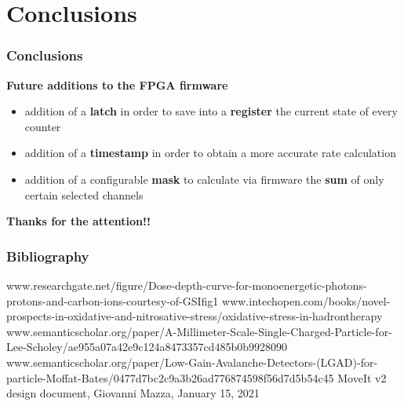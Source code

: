 \documentclass[aspectratio=169]{beamer}
\begin{document}
	\section{Conclusions}
	
	\begin{frame}
	\frametitle{Conclusions }
	\begin{center}
		\textbf{Future additions to the FPGA firmware}
	\end{center}
		\begin{itemize}
			\item addition of a \textbf{latch} in order to save into a \textbf{register} the current state of every counter 
			\item addition of a \textbf{timestamp} in order to obtain a more accurate rate calculation 
			\item addition of a configurable \textbf{mask} to calculate via firmware the \textbf{sum} of only certain selected channels 
			
		\end{itemize}
	
	\vspace{1 cm}
		\begin{center}
			\textbf{Thanks for the attention!!}
		\end{center}
		
	\end{frame}

	\begin{frame}
	\frametitle{Bibliography}
	{\scriptsize 
	\begin{thebibliography}{00}
		www.researchgate.net/figure/Dose-depth-curve-for-monoenergetic-photons-protons-and-carbon-ions-courtesy-of-GSI\textunderscore fig1\textunderscore283521369
		\newline
		www.intechopen.com/books/novel-prospects-in-oxidative-and-nitrosative-stress/oxidative-stress-in-hadrontherapy
		\newline
		www.semanticscholar.org/paper/A-Millimeter-Scale-Single-Charged-Particle-for-Lee-Scholey/ae955a07a42e9c124a8473357cd485b0b9928090
		\newline
		www.semanticscholar.org/paper/Low-Gain-Avalanche-Detectors-(LGAD)-for-particle-Moffat-Bates/0477d7bc2c9a3b26ad776874598f56d7d5b54c45
		\newline
		MoveIt v2 design document, Giovanni Mazza, January 15, 2021
	\end{thebibliography} }
	\end{frame}
\end{document}
